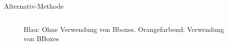 \begin{frame}{Alternativ-Methode}
\begin{columns}[c]
\begin{figure}
        \caption{Blau: Ohne Verwendung von Bboxes. \quad Orangefarbend: Verwendung von BBoxes}
      \end{figure}
    \end{columns}
  \end{frame}

